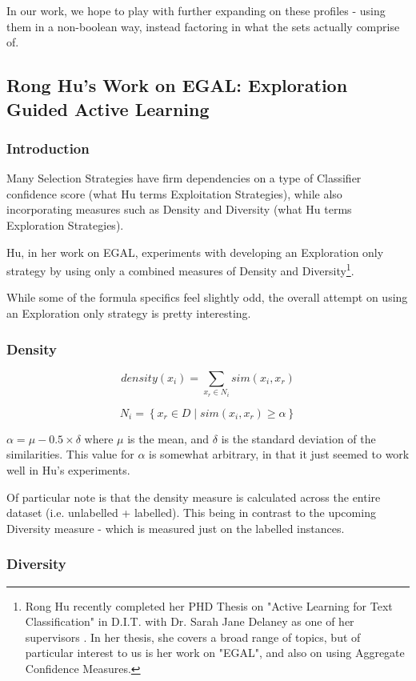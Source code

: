 \documentclass[a4paper,11pt]{report}
\begin{document}
In our work, we hope to play with further expanding on these profiles - using them in a non-boolean way, instead factoring in what the sets actually comprise of. 


\subsection{Rong Hu's Work on EGAL: Exploration Guided Active Learning}
\subsubsection{Introduction}
Many Selection Strategies have firm dependencies on a type of Classifier confidence score (what Hu terms Exploitation Strategies), while also incorporating measures such as Density and Diversity (what Hu terms Exploration Strategies).

Hu, in her work on EGAL, experiments with developing an Exploration only strategy by using only a combined measures of Density and Diversity\footnote{Rong Hu recently completed her PHD Thesis on "Active Learning for Text Classification" in D.I.T. with Dr. Sarah Jane Delaney as one of her supervisors \cite{Hu2011}. In her thesis, she covers a broad range of topics, but of particular interest to us is her work on "EGAL", and also on using Aggregate Confidence Measures.}.

While some of the formula specifics feel slightly odd, the overall attempt on using an Exploration only strategy is pretty interesting. 

\subsubsection{Density}
\[
density(x_{i})=\underset{x_{r}\in N_{i}}{\sum}sim(x_{i},x_{r})
\]

\[
N_{i}=\left\{ x_{r}\in D\mid sim(x_{i},x_{r})\geq\alpha\right\} 
\]

$\alpha=\mu-0.5\times\delta$ where $\mu$ is the mean, and $\delta$ is the standard deviation of the similarities. This value for $\alpha$ is somewhat arbitrary, in that it just seemed to work well in Hu's experiments.

Of particular note is that the density measure is calculated across the entire dataset (i.e. unlabelled + labelled). This being in contrast to the upcoming Diversity measure - which is measured just on the labelled instances.

\subsubsection{Diversity}
\end{document}

